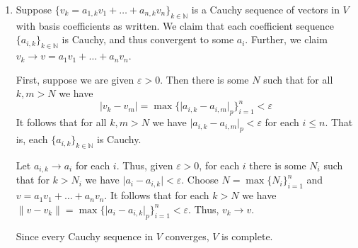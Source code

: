 \documentclass[12 pt, letterpaper]{hmcpset}
\begin{document}
\begin{solution}
\begin{enumerate}
			Finally, we show the norm satisfies the triangle inequality.
			Recall that $\lvert \cdot \rvert_{p}$ satisfies  the strong triangle inequality.
			Thus, it certainly satisfies the triangle inequality. 
			Let $v = a_{1} v_{1} + \dots + a_{n} v_{n}$ 
			and $w = b_{1} v_{1} + \dots + b_{n} v_{n}$. Then
			\begin{align*}
				\lVert v + w \rVert & = \lVert (a_{1} + b_{1}) v_{1} + \dots + (a_{n} + b_{n}) \rVert \\
						    & = \max \{ \lvert a_{1} + b_{1} \rvert_{p}, \dots, \lvert a_{n} + b_{n} \rvert_{p} \} \\
						    & \le \max \{ \lvert a_{1} \rvert_{p} + \lvert b_{1} \rvert_{p}, \dots, \lvert a_{n} \rvert_{p} + \lvert b_{n} \rvert_{p} \} \\
						    & \le \max \{ \lvert a_{1} \rvert, \dots, \lvert a_{n} \rvert \} + \max \{ \lvert b_{1} \rvert_{p}, \dots, \lvert b_{n} \rvert_{p} \} \\
						    & = \lVert v \rVert + \lVert w \rVert.
			\end{align*}
			Here the first inequality follows because
			each $\lvert a_{i} + b_{i} \rvert_{p} \le \lvert a_{i} \rvert_{p} + \lvert b_{i} \rvert_{p}$. 
			The second inequality follows because 
			for any maximum sum $\lvert a_{i} \rvert_{p} + \lvert b_{i} \rvert_{p}$,
			we have $\lvert a_{i} \rvert_{p} \le \lvert a_{j} \rvert_{p}$ 
			and $\lvert b_{i} \rvert_{p} \le \lvert b_{k} \rvert_{p}$
			where $\lvert a_{j} \rvert_{p}$ and $\lvert b_{k} \rvert_{p}$ 
			are the maximum individual absolute values.

		\item Suppose $\{ v_{k} = a_{1, k} v_{1} + \dots + a_{n, k} v_{n} \}_{k \in \mathbb{N}}$
			is a Cauchy sequence of vectors in $V$ with basis coefficients as written.
			We claim that each coefficient sequence $\{ a_{i, k} \}_{k \in \mathbb{N}}$
			is Cauchy, and thus convergent to some $a_{i}$.
			Further, we claim $v_{k} \to v = a_{1} v_{1} + \dots + a_{n} v_{n}$.

			First, suppose we are given $\varepsilon > 0$.
			Then there is some $N$ such that for all $k, m > N$ we have
			\[
				\lvert v_{k} - v_{m} \rvert =
				\max \{ \lvert a_{i, k} - a_{i, m} \rvert_{p} \}_{i = 1}^{n}
				< \varepsilon
			\]
			It follows that for all $k, m > N$ we have 
			$\lvert a_{i, k} - a_{i, m} \rvert_{p} < \varepsilon$ for each $i \le n$.
			That is, each $\{ a_{i, k} \}_{k \in \mathbb{N}}$ is Cauchy.

			Let $a_{i, k} \to a_{i}$ for each $i$. 
			Thus, given $\varepsilon > 0$,
			for each  $i$ 
			there is some $N_{i}$
			such that for $k > N_{i}$ we have $\lvert a_{i} - a_{i, k} \rvert < \varepsilon$.
			Choose $N = \max \{ N_{i} \}_{i = 1}^{n}$ 
			and $v = a_{1} v_{1} + \dots + a_{n} v_{n}$.
			It follows that for each $k > N$ we have
			$\lVert v - v_{k} \rVert 
			= \max \{ \lvert a_{i} - a_{i, k} \rvert_p \}_{i = 1}^{n} < \varepsilon$.
			Thus, $v_{k} \to v$.

			Since every Cauchy sequence in $V$ converges, $V$ is complete.
	\end{enumerate}
\end{solution}
\end{document}
